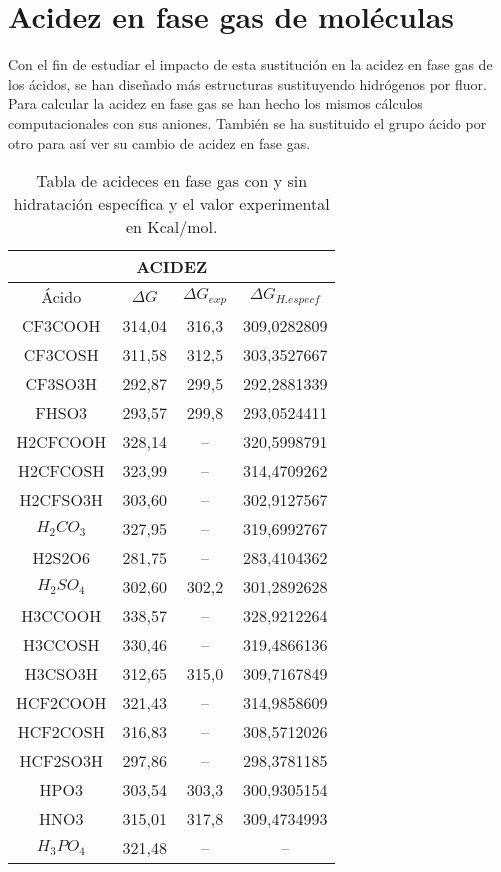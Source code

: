 \section{Acidez en fase gas de moléculas}

Con el fin de estudiar el impacto de esta sustitución en la acidez en fase gas de los ácidos, se han diseñado más estructuras sustituyendo hidrógenos por fluor. Para calcular la acidez en fase gas se han hecho los mismos cálculos computacionales con sus aniones.
También se ha sustituido el grupo ácido por otro para así ver su cambio de acidez en fase gas.

 \begin{table}[H]
     \centering
     \begin{tabular}{|c|c|c|c|}
     \hline
     \multicolumn{4}{|c|}{\bfseries{ACIDEZ}} \\ \hline
     Ácido & $\Delta G$ & $\Delta G_{exp}$ & $\Delta G_{ H. especf}$ \\ \hline
CF3COOH & 314,04 & 316,3 & 309,0282809\\ \hline
CF3COSH & 311,58 & 312,5 & 303,3527667\\ \hline
CF3SO3H & 292,87 & 299,5 &292,2881339\\ \hline
FHSO3 & 293,57 & 299,8 & 293,0524411\\ \hline
H2CFCOOH & 328,14 &-- & 320,5998791\\ \hline
H2CFCOSH & 323,99 & --& 314,4709262\\ \hline
H2CFSO3H & 303,60 & -- & 302,9127567\\ \hline
$H_2CO_3$ & 327,95	& -- & 319,6992767\\ \hline
H2S2O6 & 281,75 & -- & 283,4104362\\ \hline
$H_2SO_4$ & 302,60	& 302,2 & 301,2892628\\ \hline
H3CCOOH & 338,57 & -- &	328,9212264\\ \hline
H3CCOSH & 330,46 & -- &	319,4866136\\ \hline
H3CSO3H & 312,65 & 315,0 & 309,7167849\\ \hline
HCF2COOH & 	321,43 & -- & 314,9858609\\ \hline
HCF2COSH & 	316,83 & -- & 308,5712026\\ \hline
HCF2SO3H & 	297,86 & -- & 298,3781185\\ \hline
HPO3 & 303,54 & 303,3 & 300,9305154\\ \hline
HNO3 & 315,01 & 317,8 & 309,4734993\\ \hline
$H_3PO_4$ & 321,48	& -- & -- \\ \hline
     \end{tabular}
     \caption{Tabla de acideces en fase gas con y sin hidratación específica y el valor experimental en Kcal/mol.}
 \end{table}
 
